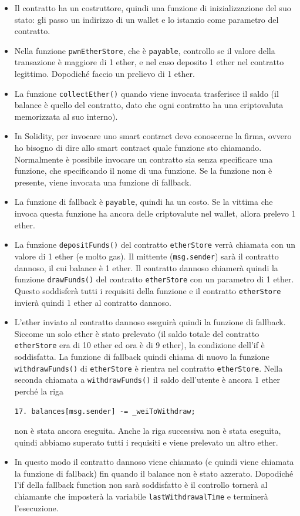 \begin{itemize}
    \item Il contratto ha un costruttore, quindi una funzione di inizializzazione del suo stato: gli passo un indirizzo di un wallet e lo istanzio come parametro del contratto.
    \item Nella funzione \texttt{pwnEtherStore}, che è \texttt{payable}, controllo se il valore della transazione è maggiore di 1 ether, e nel caso deposito 1 ether nel contratto legittimo. Dopodiché faccio un prelievo di 1 ether. \item La funzione \texttt{collectEther()} quando viene invocata trasferisce il saldo (il balance è quello del contratto, dato che ogni contratto ha una criptovaluta memorizzata al suo interno).
    \item In Solidity, per invocare uno smart contract devo conoscerne la firma, ovvero ho bisogno di dire allo smart contract quale funzione sto chiamando. Normalmente è possibile invocare un contratto sia senza specificare una funzione, che specificando il nome di una funzione. Se la funzione non è presente, viene invocata una funzione di fallback.
    \item La funzione di fallback è \texttt{payable}, quindi ha un costo. Se la vittima che invoca questa funzione ha ancora delle criptovalute nel wallet, allora prelevo 1 ether. 
    \item La funzione \texttt{depositFunds()} del contratto \texttt{etherStore} verrà chiamata con un valore di 1 ether (e molto gas). Il mittente (\texttt{msg.sender}) sarà il contratto dannoso, il cui balance è 1 ether. Il contratto dannoso chiamerà quindi la funzione \texttt{drawFunds()} del contratto \texttt{etherStore} con un parametro di 1 ether. Questo soddisferà tutti i requisiti della funzione e il contratto \texttt{etherStore} invierà quindi 1 ether al contratto dannoso.
    \item L'ether inviato al contratto dannoso eseguirà quindi la funzione di fallback. Siccome un solo ether è stato prelevato (il saldo totale del contratto \texttt{etherStore} era di 10 ether ed ora è di 9 ether), la condizione dell'if è soddisfatta. La funzione di fallback quindi chiama di nuovo la funzione \texttt{withdrawFunds()} di \texttt{etherStore} è rientra nel contratto \texttt{etherStore}. Nella seconda chiamata a \texttt{withdrawFunds()} il saldo dell'utente è ancora 1 ether perché la riga
    
    \texttt{17.   balances[msg.sender] -= \_weiToWithdraw;}
    
    non è stata ancora eseguita. Anche la riga successiva non è stata eseguita, quindi abbiamo superato tutti i requisiti e viene prelevato un altro ether.
    \item In questo modo il contratto dannoso viene chiamato (e quindi viene chiamata la funzione di fallback) fin quando il balance non è stato azzerato. Dopodiché l'if della fallback function non sarà soddisfatto è il controllo tornerà al chiamante che imposterà la variabile \texttt{lastWithdrawalTime} e terminerà l'esecuzione.
\end{itemize}
